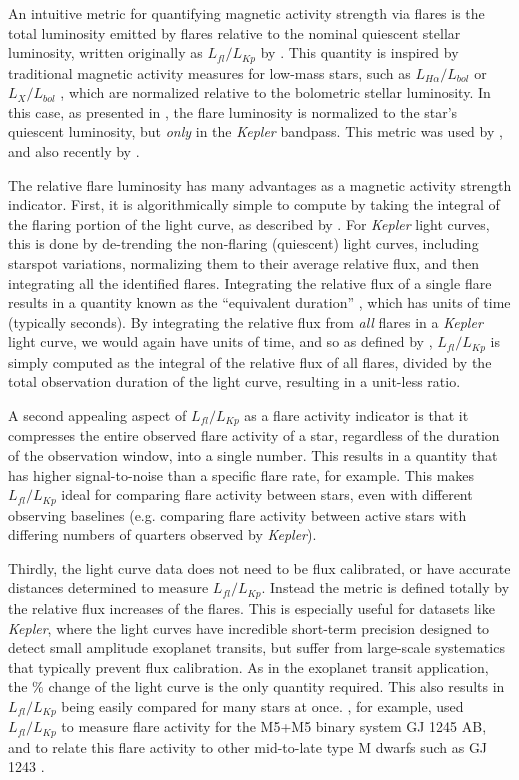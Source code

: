\documentclass[preprint2]{aastex62}
\newcommand{\Kepler}{\textsl{Kepler}\xspace}
\begin{document}
An intuitive metric for quantifying magnetic activity strength via flares is the total luminosity emitted by flares relative to the nominal quiescent stellar luminosity, written originally as $L_{fl}/L_{Kp}$ by \citet{lurie2015}. This quantity is inspired by traditional magnetic activity measures for low-mass stars, such as $L_{H\alpha}/L_{bol}$  \citep{walkowicz2004} or $L_X/L_{bol}$ \citep{pallavicini1981}, which are normalized relative to the bolometric stellar luminosity. In this case, as presented in \citet{lurie2015}, the flare luminosity is normalized to the star's quiescent luminosity, but {\it only} in the \Kepler bandpass. This metric was used by \citet{davenport2016}, and also recently by \citet{yang2017}.


The relative flare luminosity has many advantages as a magnetic activity strength indicator. First, it is algorithmically simple to compute by taking the integral of the flaring portion of the light curve, as described by \citet{kunkel1975}. For \Kepler light curves, this is done by de-trending the non-flaring (quiescent) light curves, including starspot variations, normalizing them to their average relative flux, and then integrating all the identified flares. Integrating the relative flux of a single flare results in a quantity known as the ``equivalent duration'' \citep[e.g. see][]{huntwalker2012}, which has units of time (typically seconds). By integrating the relative flux from {\it all} flares in a \Kepler light curve, we would again have units of time, and so as defined by \citet{lurie2015}, $L_{fl}/L_{Kp}$ is simply computed as the integral of the relative flux of all flares, divided by the total observation duration of the light curve, resulting in a unit-less ratio.



A second appealing aspect of $L_{fl}/L_{Kp}$ as a flare activity indicator is that it compresses the entire observed flare activity of a star, regardless of the duration of the observation window, into a single number. This results in a quantity that has higher signal-to-noise than a specific flare rate, for example. This makes $L_{fl}/L_{Kp}$ ideal for comparing flare activity between stars, even with different observing baselines (e.g. comparing flare activity between active stars with differing numbers of quarters observed by \Kepler).

Thirdly, the light curve data does not need to be flux calibrated, or have accurate distances determined to measure $L_{fl}/L_{Kp}$. Instead the metric is defined totally by the relative flux increases of the flares. This is especially useful for datasets like \Kepler, where the light curves have incredible short-term precision designed to detect small amplitude exoplanet transits, but suffer from large-scale systematics that typically prevent flux calibration. As in the exoplanet transit application, the \% change of the light curve is the only quantity required. This also results in $L_{fl}/L_{Kp}$ being easily compared for many stars at once. \citet{lurie2015}, for example, used $L_{fl}/L_{Kp}$ to measure flare activity for the M5+M5 binary system GJ 1245 AB, and to relate this flare activity to other mid-to-late type M dwarfs such as GJ 1243 \citep{davenport2014b}. 
\end{document}

